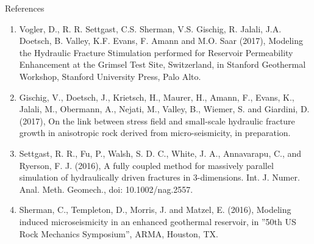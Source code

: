 \documentclass[final,t, 6pt]{beamer}
\begin{document}
\begin{frame}{}
\begin{columns}[t]
\begin{column}{.48\linewidth}
    \begin{block}{References}
      \footnotesize
      \begin{enumerate}
      \item Vogler, D., R. R. Settgast, C.S. Sherman, V.S. Gischig, R. Jalali, J.A. Doetsch, B. Valley, K.F. Evans, F. Amann and M.O. Saar (2017), Modeling the Hydraulic Fracture Stimulation performed for Reservoir Permeability Enhancement at the Grimsel Test Site, Switzerland, in Stanford Geothermal Workshop, Stanford University Press, Palo Alto.
      \item Gischig, V., Doetsch, J., Krietsch, H., Maurer, H., Amann, F., Evans, K., Jalali, M., Obermann, A., Nejati, M., Valley, B., Wiemer, S. and Giardini, D. (2017), On the link between stress field and small-scale hydraulic fracture growth in anisotropic rock derived from micro-seismicity, in preparation.
      \item Settgast, R. R., Fu, P., Walsh, S. D. C., White, J. A., Annavarapu, C., and Ryerson, F. J. (2016), A fully coupled method for massively parallel simulation of hydraulically driven fractures in 3-dimensions. Int. J. Numer. Anal. Meth. Geomech., doi: 10.1002/nag.2557.
      \item Sherman, C., Templeton, D., Morris, J. and Matzel, E. (2016), Modeling induced microseismicity in an enhanced geothermal reservoir, in ''50th US Rock Mechanics Symposium'', ARMA, Houston, TX.
      \end{enumerate}
      \normalsize
      \vskip -0.8cm
    \end{block}
  
  


  \end{column}

\end{columns}      


\end{frame}
\end{document}
